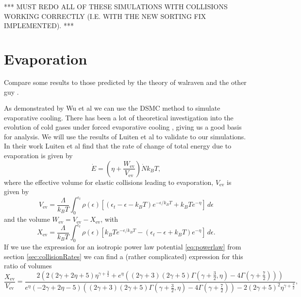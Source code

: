 *** MUST REDO ALL OF THESE SIMULATIONS WITH COLLISIONS WORKING CORRECTLY (I.E. WITH THE NEW SORTING FIX IMPLEMENTED). ***

\section{Evaporation} \label{sec:evaporation}

Compare some results to those predicted by the theory of walraven \cite{Walraven2010} and the other guy \cite{Luiten1996} . 

As demonstrated by Wu et al \cite{Wu1996, Wu1997} we can use the DSMC method to simulate evaporative cooling.
There has been a lot of theoretical investigation into the evolution of cold gases under forced evaporative cooling \cite{Davis1995, Luiten1996, Holland1996}, giving us a good basis for analysis.
We will use the results of Luiten et al \cite{Luiten1996} to validate to our simulations.
In their work Luiten et al find that the rate of change of total energy due to evaporation is given by 
\begin{equation*}    
    \dot{E} = \left( \eta + \frac{W_{\mathrm{ev}}}{V_{\mathrm{ev}}}\right) \dot{N} k_B T, \label{eq:evapEnergy}
\end{equation*}
where the effective volume for elastic collisions leading to evaporation, $V_\mathrm{ev}$ is given by
\begin{equation*}
    V_\mathrm{ev} = \frac{\Lambda}{k_B T} \int_0^{\epsilon_t} \rho(\epsilon)\left[\left(\epsilon_t-\epsilon-k_B T\right)e^{-\epsilon/k_B T} + k_B T e^{-\eta}\right]\,d\epsilon
\end{equation*}
and the volume $W_\mathrm{ev} = V_\mathrm{ev} - X_\mathrm{ev} $, with
\begin{equation*}
    X_\mathrm{ev} = \frac{\Lambda}{k_B T} \int_0^{\epsilon_t} \rho(\epsilon)\left[k_B Te^{-\epsilon/k_B T}  - \left(\epsilon_t-\epsilon+k_B T\right)e^{-\eta}\right]\,d\epsilon.
\end{equation*}
If we use the expression for an isotropic power law potential \eqref{eq:powerlaw} from section \ref{sec:collisionRates} we can find a (rather complicated) expression for this ratio of volumes
\begin{equation*}
    \frac{X_\mathrm{ev}}{V_\mathrm{ev}} = \frac{2 \left(2 (2 \gamma +2 \eta +5) \eta ^{\gamma +\frac{3}{2}}+e^{\eta } \left((2 \gamma +3) (2 \gamma +5) \Gamma \left(\gamma +\frac{3}{2},\eta \right)-4 \Gamma \left(\gamma +\frac{7}{2}\right)\right)\right)}{e^{\eta } (-2 \gamma +2 \eta -5) \left((2 \gamma +3) (2 \gamma +5) \Gamma \left(\gamma +\frac{3}{2},\eta \right)-4 \Gamma \left(\gamma +\frac{7}{2}\right)\right)-2 (2 \gamma +5)^2 \eta ^{\gamma +\frac{3}{2}}},
\end{equation*}
